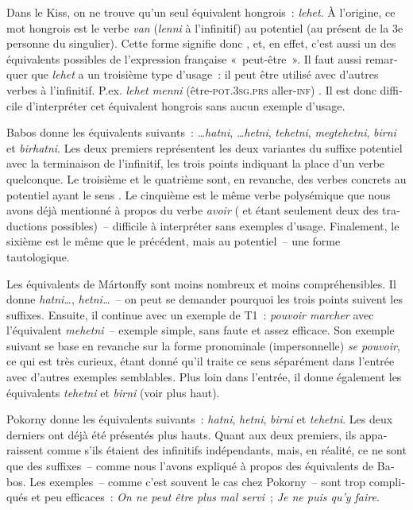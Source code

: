 \documentclass[output=paper,colorlinks,citecolor=brown,arabicfont,chinesefont,booklanguage=french]{langscibook}
\begin{document}
\begin{otherlanguage}{french}
Dans le Kiss, on ne trouve qu’un seul équivalent hongrois~: \emph{lehet}. À l’origine, ce mot hongrois est le verbe \emph{van}  (\emph{lenni} à l’infinitif) au potentiel (au présent de la 3e personne du singulier). Cette forme signifie donc , et, en effet, c’est aussi un des équivalents possibles de l’expression française «~peut-être~». Il faut aussi remarquer que \emph{lehet} a un troisième type d’usage~: il peut être utilisé avec d’autres verbes à l’infinitif. P.ex. \emph{lehet menni} (être-\textsc{pot.3sg.prs} aller-\textsc{inf}) . Il est donc difficile d’interpréter cet équivalent hongrois sans aucun exemple d’usage.

\begin{sloppypar}
Babos donne les équivalents suivants~: \emph{…hatni}, \emph{…hetni}, \emph{tehetni}, \emph{megtehetni}, \emph{birni} et \emph{birhatni}. Les deux premiers représentent les deux variantes du suffixe potentiel avec la terminaison de l’infinitif, les trois points indiquant la place d’un verbe quelconque. Le troisième et le quatrième sont, en revanche, des verbes concrets au potentiel ayant le sens . Le cinquième est le même verbe polysémique que nous avons déjà mentionné à propos du verbe \emph{avoir} ( et  étant seulement deux des traductions possibles)~-- difficile à interpréter sans exemples d’usage. Finalement, le sixième est le même que le précédent, mais au potentiel~-- une forme tautologique.
\end{sloppypar}

Les équivalents de Mártonffy sont moins nombreux et moins compréhensibles. Il donne \emph{hatni…}, \emph{hetni…}~-- on peut se demander pourquoi les trois points suivent les suffixes. Ensuite, il continue avec un exemple de T1~: \emph{pouvoir marcher} avec l’équivalent \emph{mehetni}~-- exemple simple, sans faute et assez efficace. Son exemple suivant se base en revanche sur la forme pronominale (impersonnelle) \emph{se pouvoir}, ce qui est très curieux, étant donné qu’il traite ce sens séparément dans l’entrée avec d’autres exemples semblables. Plus loin dans l’entrée, il donne également les équivalents \emph{tehetni}  et \emph{birni} (voir plus haut).

Pokorny donne les équivalents suivants~: \emph{hatni}, \emph{hetni}, \emph{birni} et \emph{tehetni}. Les deux derniers ont déjà été présentés plus hauts. Quant aux deux premiers, ils apparaissent comme s’ils étaient des infinitifs indépendants, mais, en réalité, ce ne sont que des suffixes~-- comme nous l’avons expliqué à propos des équivalents de Babos. Les exemples~-- comme c’est souvent le cas chez Pokorny~-- sont trop compliqués et peu efficaces~: \emph{On ne peut être plus mal servi}~; \emph{Je ne puis qu’y faire}.  


\end{otherlanguage}
\end{document}
